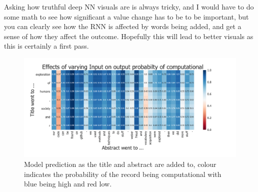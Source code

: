\documentclass[12pt, a4paper]{article}
\begin{document}
Asking how truthful deep NN visuals are is always tricky, and I would have to do some math to see how significant a value change has to be to be important, but you can clearly see how the RNN is affected by words being added, and get a sense of how they affect the outcome. Hopefully this will lead to better visuals as this is certainly a first pass.
 
\begin{figure}[ht]
	\centering
	\includegraphics[width=1\textwidth]{occ}
	\caption{Model prediction as the title and abstract are added to, colour indicates the probability of the record being computational with blue being high and red low.}\label{oc2}
\end{figure}
\end{document}
